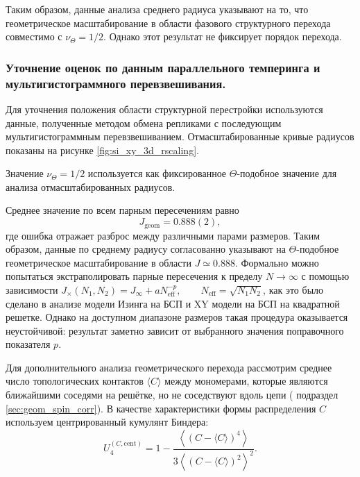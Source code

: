  
 
 Таким образом, данные  анализа среднего радиуса указывают на то, что геометрическое масштабирование в области фазового структурного перехода  совместимо с $\nu_{\Theta}=1/2$. 
 Однако этот результат не фиксирует порядок перехода. 
 
 
  \subsubsection{Уточнение оценок по данным параллельного темперинга и мультигистограммного перевзвешивания.} 
 
 Для уточнения положения области структурной перестройки используются данные, полученные методом обмена репликами с последующим мультигистограммным перевзвешиванием. Отмасштабированные кривые радиусов показаны на рисунке \ref{fig:si_xy_3d_rscaling}.  


Значение $\nu_{\Theta}=1/2$ используется как фиксированное $\Theta$-подобное значение для анализа отмасштабированных радиусов.
 
  Среднее значение по всем парным пересечениям равно
  \[
  J_{\mathrm{geom}} = 0.888(2),
  \]
  где ошибка отражает разброс между различными парами размеров. 
  Таким образом, данные по среднему радиусу согласованно указывают на $\Theta$-подобное геометрическое масштабирование в области $J\simeq0.888$. 
   Формально можно попытаться экстраполировать парные пересечения к пределу $N\to\infty$ с помощью зависимости
   $
   J_{\times}(N_1,N_2)=J_{\infty}+aN_{\mathrm{eff}}^{-p},
   \qquad 
   N_{\mathrm{eff}}=\sqrt{N_1N_2}$, как это было сделано в анализе модели Изинга на БСП и XY модели на БСП на квадратной решетке. 
   Однако на доступном диапазоне размеров такая процедура оказывается неустойчивой: результат заметно зависит от выбранного значения поправочного показателя $p$. 
   
 Для дополнительного анализа геометрического перехода рассмотрим среднее число топологических контактов $ \langle C \rangle$ между мономерами, которые являются ближайшими
 соседями на решётке, но не соседствуют вдоль цепи ( подраздел \ref{sec:geom_spin_corr}). 
 В качестве характеристики
 формы распределения $C$ используем центрированный кумулянт Биндера:
 \begin{equation}
 	 \label{eq:binder_contacts}
 U_4^{(C,\mathrm{cent})}
 =
 1-
 \frac{
 	\left\langle \left(C-\langle C\rangle\right)^4 \right\rangle
 }{
 	3\left\langle \left(C-\langle C\rangle\right)^2 \right\rangle^2
 }.
 \end{equation}


